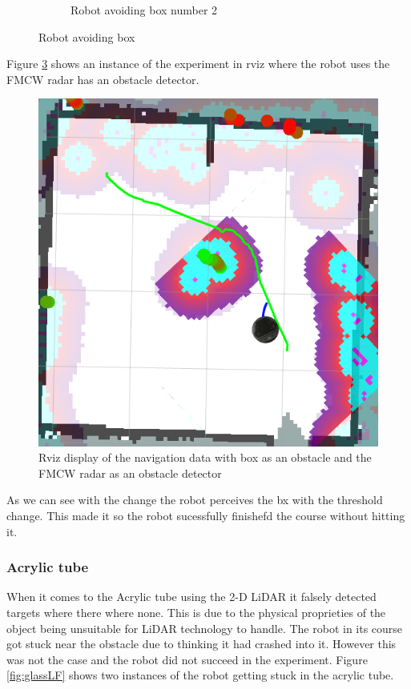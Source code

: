 \begin{figure}[ht!]
\begin{subfigure}[b]{0.47\linewidth}
    \caption{Robot avoiding box  number 2}
    \label{fig::boxRS2}
  \end{subfigure}
  \caption{Robot avoiding box}
  \label{fig:boxRS}
\end{figure}
Figure \ref{fig:rvizboxradar} shows an instance of the experiment in rviz where the robot uses the \ac{FMCW} \ac{radar} has an obstacle detector.
\begin{figure}[ht!]
\centerline{\includegraphics [width=0.5 \textwidth]{imgs/chapter5/rvizboxradar.png}}
\caption{Rviz display of the navigation data with box as an obstacle and the \ac{FMCW} \ac{radar} as an obstacle detector}
\label{fig:rvizboxradar}
\end{figure}
As we can see  with the change the robot perceives the bx with the threshold change. This made it so the robot sucessfully finishefd the course without hitting it.
\subsubsection{Acrylic tube}


When it comes to the Acrylic tube using the 2-D \ac{LiDAR} it falsely detected targets where there where none. This is due to the physical proprieties of the object being unsuitable for \ac{LiDAR} technology to handle. The robot in its course got stuck near the obstacle due to thinking it had crashed into it. However this was not the case and the robot did not succeed in the experiment. Figure \ref{fig:glassLF} shows two instances of the robot getting stuck in the acrylic tube.

